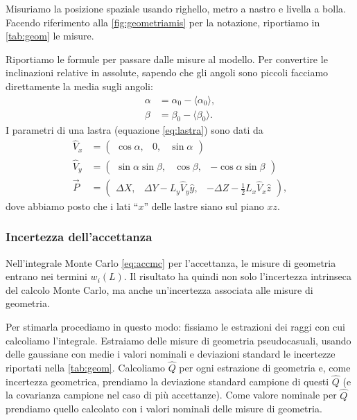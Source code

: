 Misuriamo la posizione spaziale usando righello, metro a nastro e livella a bolla.
Facendo riferimento alla \autoref{fig:geometriamis} per la notazione, riportiamo
in \autoref{tab:geom} le misure.

Riportiamo le formule per passare dalle misure al modello.
Per convertire le inclinazioni relative in assolute,
sapendo che gli angoli sono piccoli facciamo direttamente la media sugli angoli:
\begin{align*}
	\alpha &= \alpha_0 - \langle\alpha_0\rangle, \\
	\beta  &= \beta_0  - \langle\beta_0\rangle.
\end{align*}
I parametri di una lastra (equazione \ref{eq:lastra}) sono dati da
\begin{align*}
	\hat V_x &= \begin{pmatrix}
		\cos\alpha, & 0, & \sin\alpha
	\end{pmatrix} \\
	\hat V_y &= \begin{pmatrix}
		\sin\alpha\sin\beta, & \cos\beta, & -\cos\alpha\sin\beta
	\end{pmatrix} \\
	\vec P &= \begin{pmatrix}
		\Delta X, & \Delta Y - L_y\hat V_y\hat y, & -\Delta Z - \frac12 L_x\hat V_x\hat z
	\end{pmatrix},
\end{align*}
dove abbiamo posto che i lati ``$x$'' delle lastre siano sul piano $xz$.

\subsubsection{Incertezza dell'accettanza}

Nell'integrale Monte Carlo \eqref{eq:accmc} per l'accettanza,
le misure di geometria entrano nei termini $w_i(L)$.
Il risultato ha quindi non solo l'incertezza intrinseca del calcolo Monte Carlo,
ma anche un'incertezza associata alle misure di geometria.

Per stimarla procediamo in questo modo:
fissiamo le estrazioni dei raggi con cui calcoliamo l'integrale.
Estraiamo delle misure di geometria pseudocasuali,
usando delle gaussiane con medie i valori nominali e deviazioni standard le incertezze
riportati nella \autoref{tab:geom}.
Calcoliamo $\hat Q$ per ogni estrazione di geometria e, come incertezza geometrica,
prendiamo la deviazione standard campione di questi $\hat Q$
(e la covarianza campione nel caso di più accettanze).
Come valore nominale per $\hat Q$ prendiamo quello calcolato con i valori nominali delle misure di geometria.
